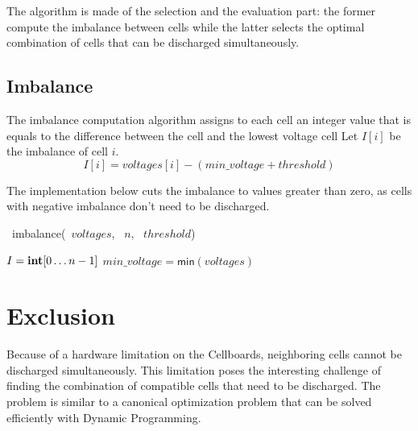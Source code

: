 The algorithm is made of the selection and the evaluation part: the former compute the imbalance between cells while the latter selects the optimal combination of cells that can be discharged simultaneously.

\subsection{Imbalance}

The imbalance computation algorithm assigns to each cell an integer value that is equals to the difference between the cell and the lowest voltage cell
Let $I[i]$ be the imbalance of cell $i$.
\[
    I[i] = voltages[i] - (min\_voltage + threshold)
\]

The implementation below cuts the imbalance to values greater than zero, as cells with negative imbalance don't need to be discharged.

\begin{algorithm}[H]
    \DontPrintSemicolon
    \NoCaptionOfAlgo
    \caption[imbalance]{\INTARRAY\ \textsf{imbalance}(\INTARRAY\ $voltages$, \INTEGER\ $n$, \INTEGER\ $threshold$)}\label{algorithm:imbalance}


    $I = \INTEGER[0 \ldots n-1]$\;
    $min\_voltage=\textsf{min}(voltages)$\;
\end{algorithm}

\section{Exclusion}
Because of a hardware limitation on the Cellboards, neighboring cells cannot be discharged simultaneously. This limitation poses the interesting challenge of finding the combination of compatible cells that need to be discharged. The problem is similar to a canonical optimization problem that can be solved efficiently with Dynamic Programming.

